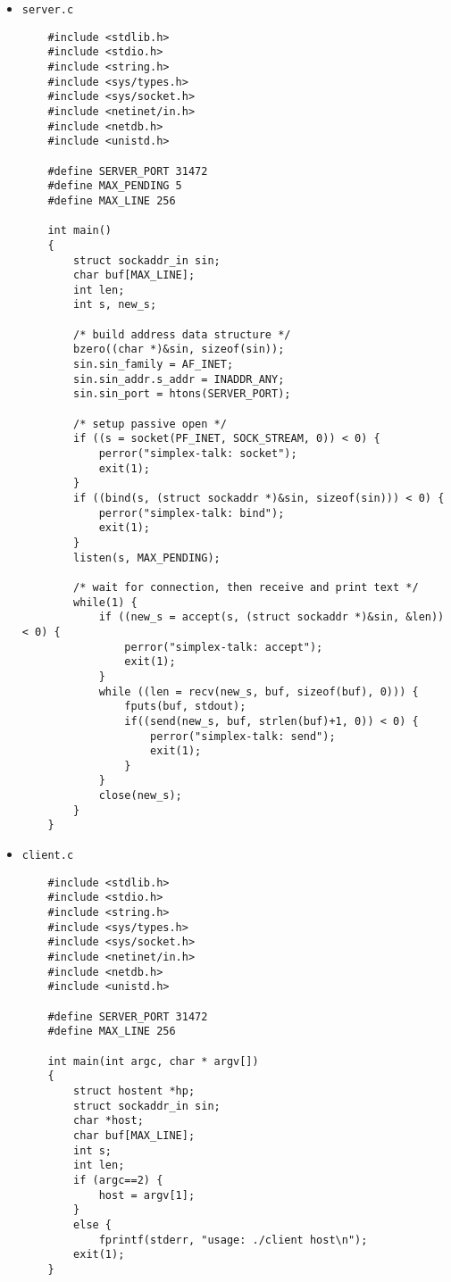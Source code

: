 \documentclass[a4paper,10pt]{article}
\begin{document}
    \begin{itemize}
        \item {\tt server.c}
            \begin{lstlisting}
    #include <stdlib.h>
    #include <stdio.h>
    #include <string.h>
    #include <sys/types.h>
    #include <sys/socket.h>
    #include <netinet/in.h>
    #include <netdb.h>
    #include <unistd.h>
    
    #define SERVER_PORT 31472
    #define MAX_PENDING 5
    #define MAX_LINE 256
    
    int main()
    {
    	struct sockaddr_in sin;
    	char buf[MAX_LINE];
    	int len;
    	int s, new_s;
    
    	/* build address data structure */
    	bzero((char *)&sin, sizeof(sin));
    	sin.sin_family = AF_INET;
    	sin.sin_addr.s_addr = INADDR_ANY;
    	sin.sin_port = htons(SERVER_PORT);
    
    	/* setup passive open */
    	if ((s = socket(PF_INET, SOCK_STREAM, 0)) < 0) {
    		perror("simplex-talk: socket");
    		exit(1);
    	}
    	if ((bind(s, (struct sockaddr *)&sin, sizeof(sin))) < 0) {
    		perror("simplex-talk: bind");
    		exit(1);
    	}
    	listen(s, MAX_PENDING);
    
    	/* wait for connection, then receive and print text */
    	while(1) {
    		if ((new_s = accept(s, (struct sockaddr *)&sin, &len)) < 0) {
    			perror("simplex-talk: accept");
    			exit(1);
    		}
    		while ((len = recv(new_s, buf, sizeof(buf), 0))) {
    			fputs(buf, stdout);
                if((send(new_s, buf, strlen(buf)+1, 0)) < 0) {
                    perror("simplex-talk: send");
                    exit(1);
                }
            }
    		close(new_s);
    	}
    }
            \end{lstlisting}
        
        \item {\tt client.c}
            \begin{lstlisting}
    #include <stdlib.h>
    #include <stdio.h>
    #include <string.h>
    #include <sys/types.h>
    #include <sys/socket.h>
    #include <netinet/in.h>
    #include <netdb.h>
    #include <unistd.h>
    
    #define SERVER_PORT 31472
    #define MAX_LINE 256
    
    int main(int argc, char * argv[])
    {
    	struct hostent *hp;
    	struct sockaddr_in sin;
    	char *host;
    	char buf[MAX_LINE];
    	int s;
    	int len;
    	if (argc==2) {
    		host = argv[1];
    	}
    	else {
    		fprintf(stderr, "usage: ./client host\n");
    	exit(1);
    }
    

\end{lstlisting}
\end{itemize}
\end{document}
